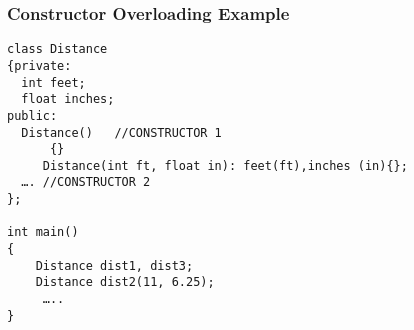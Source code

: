 \documentclass{beamer}
\newtheorem{Key points}{Key points}
\newcommand\Fontviaa{\fontsize{8}{7.2}\selectfont}
\begin{document}
\begin{frame}[fragile]
\frametitle{Constructor Overloading Example}
\Fontviaa
\begin{lstlisting}
class Distance
{private:
  int feet;
  float inches;
public:
  Distance()   //CONSTRUCTOR 1 
      {}
     Distance(int ft, float in): feet(ft),inches (in){}; 
  …. //CONSTRUCTOR 2
};

int main()
{
 	Distance dist1, dist3; 
	Distance dist2(11, 6.25); 
	 …..
}	
\end{lstlisting}
\end{frame}
\end{document}
